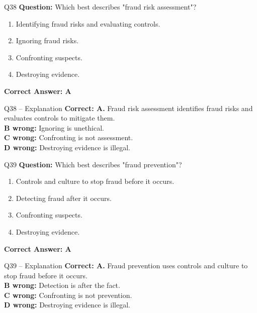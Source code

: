 \documentclass[aspectratio=169,10pt]{beamer}
\begin{document}
	\begin{frame}[t]{Q38}
		\small
		\textbf{Question:} Which best describes "fraud risk assessment"?
		\begin{enumerate}[label=\Alph*.,itemsep=1pt,topsep=2pt]
			\item Identifying fraud risks and evaluating controls.
			\item Ignoring fraud risks.
			\item Confronting suspects.
			\item Destroying evidence.
		\end{enumerate}
		\vspace{4pt}
		\textbf{Correct Answer: A}
	\end{frame}
	
	\begin{frame}[t]{Q38 -- Explanation}
		\small
		\textbf{Correct: A.} Fraud risk assessment identifies fraud risks and evaluates controls to mitigate them. \\[4pt]
		\textbf{B wrong:} Ignoring is unethical. \\[2pt]
		\textbf{C wrong:} Confronting is not assessment. \\[2pt]
		\textbf{D wrong:} Destroying evidence is illegal.
	\end{frame}
	
	\begin{frame}[t]{Q39}
		\small
		\textbf{Question:} Which best describes "fraud prevention"?
		\begin{enumerate}[label=\Alph*.,itemsep=1pt,topsep=2pt]
			\item Controls and culture to stop fraud before it occurs.
			\item Detecting fraud after it occurs.
			\item Confronting suspects.
			\item Destroying evidence.
		\end{enumerate}
		\vspace{4pt}
		\textbf{Correct Answer: A}
	\end{frame}
	
	\begin{frame}[t]{Q39 -- Explanation}
		\small
		\textbf{Correct: A.} Fraud prevention uses controls and culture to stop fraud before it occurs. \\[4pt]
		\textbf{B wrong:} Detection is after the fact. \\[2pt]
		\textbf{C wrong:} Confronting is not prevention. \\[2pt]
		\textbf{D wrong:} Destroying evidence is illegal.
	\end{frame}
	
\end{document}

